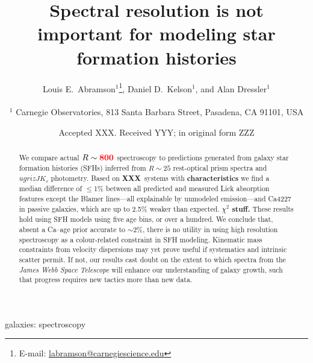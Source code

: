 \documentclass[a4paper,fleqn,usenatbib]{mnras}
\title[More is not better]{Spectral resolution is not important for modeling star formation histories}
\author[Abramson, Kelson, \& Dressler]{Louis E.~Abramson$^{1}$\thanks{E-mail: \href{mailto:labramson@carnegiescience.edu}{labramson@carnegiescience.edu}},
Daniel D.~Kelson$^{1}$,
and Alan Dressler$^{1}$
\\
\\
$^1$	Carnegie Observatories, 813 Santa Barbara Street, Pasadena, CA 91101, USA\\
}
\date{Accepted XXX. Received YYY; in original form ZZZ}
\newcommand{\Mstel}{M_\ast}
\newcommand{\bfr}{\bf\color{red}}
\newcommand{\ntot}{{\bfr XXX}} %
\begin{document}
\label{firstpage}
\pagerange{\pageref{firstpage}--\pageref{lastpage}}
\maketitle

\begin{abstract}

	We compare actual $R\sim{\bfr 800}$ spectroscopy to predictions generated from galaxy 
	star formation histories (SFHs) inferred from $R\sim25$ rest-optical prism spectra 
	and $ugrizJK_{s}$ photometry. Based on \ntot\ systems with {\bfr characteristics} 
	we find a median difference of 
	$\leq$1\% between all predicted and measured Lick absorption features except the Blamer 
	lines---all explainable by unmodeled emission---and Ca4227 in passive galaxies, 
	which are up to 2.5\% weaker than expected. {\bfr $\chi^{2}$ stuff.}
	These results hold using SFH models using five age bins, or over a hundred. 
	We conclude that, absent a Ca--age prior accurate to $\sim$2\%, there is no utility in using 
	high resolution spectroscopy as a colour-related constraint in SFH modeling. 
	Kinematic mass constraints from velocity dispersions may yet prove useful if systematics
	and intrinsic scatter permit. If not, our results cast doubt on the extent to which 
	spectra from the {\it James Webb Space Telescope} will enhance our understanding of 
	galaxy growth, such that progress requires new tactics more than new data.

\end{abstract}

\begin{keywords}
	galaxies: spectroscopy
\end{keywords}


\end{document}
